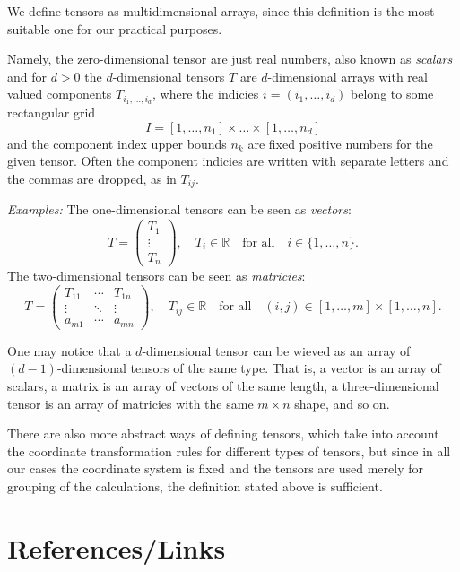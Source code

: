 \documentclass[]{article}
\begin{document}
We define tensors as multidimensional arrays, since this definition is the most
suitable one for our practical purposes.

Namely, the zero-dimensional tensor are just real numbers, also known as
\emph{scalars} and for $d > 0$ the $d$-dimensional tensors $T$ are $d$-dimensional
arrays with real valued components $T_{i_1, \ldots, i_d}$, where the indicies
$i = (i_1, \ldots, i_d)$ belong to some rectangular grid
\[
I = [1, \ldots, n_1]\times \ldots \times [1, \ldots, n_d]
\]
and the component index upper bounds $n_k$ are fixed positive numbers for the given
tensor. Often the component indicies are written with separate letters and the
commas are dropped, as in $T_{ij}$.

\emph{Examples:} The one-dimensional tensors can be seen as \emph{vectors}:
\[
T = \begin{pmatrix}
  T_1\\
  \vdots\\
  T_n
 \end{pmatrix}, \quad T_i \in \mathbb{R} \quad \text{for all} \quad
i \in \{1, \ldots, n\}.
\]
The two-dimensional tensors can be seen as \emph{matricies}:
\[
T = \begin{pmatrix}
  T_{11} & \cdots & T_{1n} \\
  \vdots  & \ddots & \vdots  \\
  a_{m1} & \cdots & a_{mn}
 \end{pmatrix},
 \quad  T_{ij} \in \mathbb{R}
 \quad \text{for all} \quad (i,j) \in [1,\ldots, m] \times [1, \ldots, n].
\]

One may notice that a $d$-dimensional tensor can be wieved as an array of
$(d-1)$-dimensional tensors of the same type. That is, a vector is an array of
scalars, a matrix is an array of vectors of the same length, a three-dimensional
tensor is an array of matricies with the same $m \times n$ shape, and so on.

There are also more abstract ways of defining tensors, which take into account
the coordinate transformation rules for different types of tensors, but since in
all our cases the coordinate system is fixed and the tensors are used merely for
grouping of the calculations, the definition stated above is sufficient.

\section{References/Links}
\end{document}

